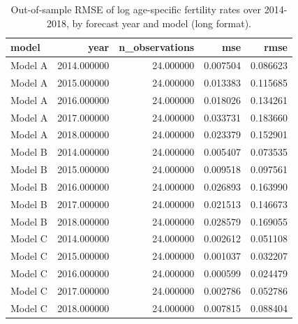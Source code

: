 \begin{table}[ht]
\centering
\begin{tabular}{lrrrr}
\hline
model & year & n_observations & mse & rmse \\
\hline
Model A & 2014.000000 & 24.000000 & 0.007504 & 0.086623 \\
Model A & 2015.000000 & 24.000000 & 0.013383 & 0.115685 \\
Model A & 2016.000000 & 24.000000 & 0.018026 & 0.134261 \\
Model A & 2017.000000 & 24.000000 & 0.033731 & 0.183660 \\
Model A & 2018.000000 & 24.000000 & 0.023379 & 0.152901 \\
Model B & 2014.000000 & 24.000000 & 0.005407 & 0.073535 \\
Model B & 2015.000000 & 24.000000 & 0.009518 & 0.097561 \\
Model B & 2016.000000 & 24.000000 & 0.026893 & 0.163990 \\
Model B & 2017.000000 & 24.000000 & 0.021513 & 0.146673 \\
Model B & 2018.000000 & 24.000000 & 0.028579 & 0.169055 \\
Model C & 2014.000000 & 24.000000 & 0.002612 & 0.051108 \\
Model C & 2015.000000 & 24.000000 & 0.001037 & 0.032207 \\
Model C & 2016.000000 & 24.000000 & 0.000599 & 0.024479 \\
Model C & 2017.000000 & 24.000000 & 0.002786 & 0.052786 \\
Model C & 2018.000000 & 24.000000 & 0.007815 & 0.088404 \\
\hline
\end{tabular}
\caption{Out-of-sample RMSE of log age-specific fertility rates over 2014-2018, by forecast year and model (long format).}
\label{tab:revised_table_e6_long}
\end{table}
